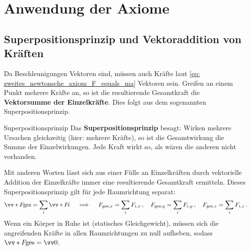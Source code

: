 \section{Anwendung der Axiome}\label{sec: anwendung_axiome}
\subsection{Superpositionsprinzip und Vektoraddition von Kräften}\label{subsec: superposition_von_kräften}
Da Beschleunigungen Vektoren sind, müssen auch Kräfte laut \cref{eq: zweites_newtonsche_axiom_F_equals_ma} Vektoren sein. Greifen an einem Punkt mehrere Kräfte an, so ist die resultierende Gesamtkraft die \textbf{Vektorsumme der Einzelkräfte}. Dies folgt aus dem sogenannten Superpositionsprinzip. 
\begin{rememberbox}{Superpositionsprinzip}
     Das \textbf{Superpositionsprinzip} besagt: Wirken mehrere Ursachen gleichzeitig (hier: mehrere Kräfte), so ist die Gesamtwirkung die Summe der Einzelwirkungen. Jede Kraft wirkt so, als wären die anderen nicht vorhanden.
\end{rememberbox}
Mit anderen Worten lässt sich aus einer Fülle an Einzelkräften durch vektorielle Addition der Einzelkräfte immer eine resultierende Gesamtkraft ermitteln. Dieses Superpositionsprinzip  gilt für jede Raumrichtung separat:
\begin{equation}
    \ivecS{F}{\text{ges}} = \sum_{i} \ivecS{F}{i} \quad \implies \quad F_{\text{ges},x} = \sum_{i} F_{i,x}\mComma \quad F_{\text{ges},y} = \sum_{i} F_{i,y}\mComma \quad F_{\text{ges},z} = \sum_{i} F_{i,z} \mDot
\end{equation}
Wenn ein Körper in Ruhe ist (statisches Gleichgewicht), müssen sich die angreifenden Kräfte in allen Raumrichtungen zu null aufheben, sodass $\ivecS{F}{\text{ges}} = \ivec{0}$. 
